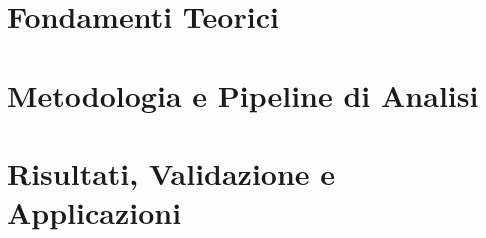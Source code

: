 \documentclass[twoside,greek]{toptesi}
\begin{document}

\indici%


\mainmatter

\part{Fondamenti Teorici}







\part{Metodologia e Pipeline di Analisi}





\part{Risultati, Validazione e Applicazioni}








\end{document}
